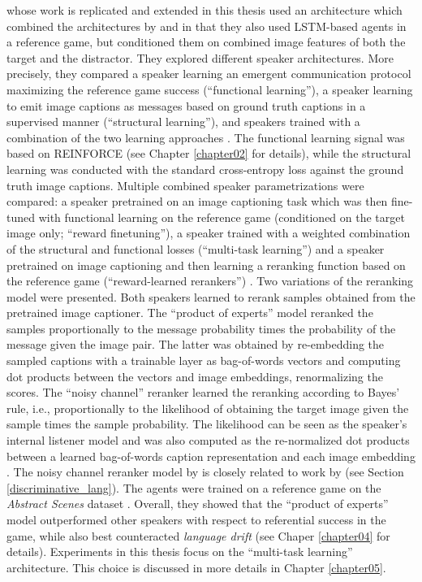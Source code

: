 \cite{lazaridou2020multi} whose work is replicated and extended in this thesis used an architecture which combined the architectures by \cite{lazaridou2016multi} and \cite{havrylov2017emergence} in that they also used LSTM-based agents in a reference game, but conditioned them on combined image features of both the target and the distractor. They explored different speaker architectures. More precisely, they compared a speaker learning an emergent communication protocol maximizing the reference game success (``functional learning''), a speaker learning to emit image captions as messages based on ground truth captions in a supervised manner (``structural learning''), and speakers trained with a combination of the two learning approaches \parencite[][p.~4]{lazaridou2020multi}. The functional learning signal was based on REINFORCE (see Chapter \ref{chapter02} for details), while the structural learning was conducted with the standard cross-entropy loss against the ground truth image captions. Multiple combined speaker parametrizations were compared: a speaker pretrained on an image captioning task which was then fine-tuned with functional learning on the reference game (conditioned on the target image only; ``reward finetuning''), a speaker trained with a weighted combination of the structural and functional losses (``multi-task learning'') and a speaker pretrained on image captioning and then learning a reranking function based on the reference game (``reward-learned rerankers'') \parencite[][p.~4--5]{lazaridou2020multi}. Two variations of the reranking model were presented. Both speakers learned to rerank samples obtained from the pretrained image captioner. The ``product of experts'' model reranked the samples proportionally to the message probability times the probability of the message given the image pair. The latter was obtained by re-embedding the sampled captions with a trainable layer as bag-of-words vectors and computing dot products between the vectors and image embeddings, renormalizing the scores.  The ``noisy channel'' reranker learned the reranking according to Bayes' rule, i.e., proportionally to the likelihood of obtaining the target image given the sample times the sample probability. The likelihood can be seen as the speaker's internal listener model and was also computed as the re-normalized dot products between a learned bag-of-words caption representation and each image embedding \parencite[][p.~5--6]{lazaridou2020multi}. The noisy channel reranker model by \cite{lazaridou2020multi} is closely related to work by \cite{andreas2016reasoning} (see Section \ref{discriminative_lang}).
The agents were trained on a reference game on the \textit{Abstract Scenes} dataset \parencite{zitnick2013bringing}.
Overall, they showed that the ``product of experts'' model outperformed other speakers with respect to referential success in the game, while also best counteracted \textit{language drift} (see Chaper \ref{chapter04} for details). 
Experiments in this thesis focus on the ``multi-task learning'' architecture. This choice is discussed in more details in Chapter \ref{chapter05}.

